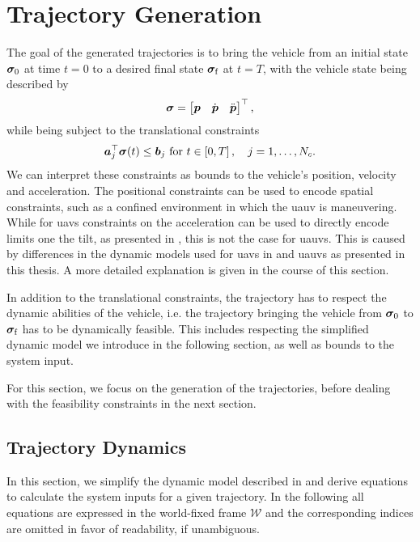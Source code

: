 \section{Trajectory Generation}
\label{sec:trajectory-generation}
The goal of the generated trajectories is to bring the vehicle from an initial state $\bm{\sigma}_0$ at time $t=0$ to a desired final state $\bm{\sigma}_{\text{f}}$ at $t=T$, with the vehicle state being described by 
\begin{equation}
	\bm{\sigma} = 
	\begin{bmatrix}
		\mbox{$\bm{p}$} & \mbox{$\dot{\bm{p}}$} & \mbox{$\ddot{\bm{p}}$}
	\end{bmatrix}^\top
	,
\end{equation}
while being subject to the translational constraints
\begin{equation}
	\label{eq:translational-constraints}
	\mbox{$\bm{a}$}_j^\top \bm{\sigma}(t) \leq \mbox{$\bm{b}$}_j
	\text{ for }
	t \in \left[0,T\right],
	\quad
	j=1,\dots,N_c
	.
\end{equation}
We can interpret these constraints as bounds to the vehicle's position, velocity and acceleration. The positional constraints can be used to encode spatial constraints, such as a confined environment in which the \ac{uauv} is maneuvering. While for \acp{uav} constraints on the acceleration can be used to directly encode limits one the tilt, as presented in \cite{MuellerHehn15}, this is not the case for \acp{uauv}. This is caused by differences in the dynamic models used for \acp{uav} in \cite{MuellerHehn15} and \acp{uauv} as presented in this thesis. A more detailed explanation is given in the course of this section.

In addition to the translational constraints, the trajectory has to respect the dynamic abilities of the vehicle, i.e. the trajectory bringing the vehicle from $\bm{\sigma}_0$ to $\bm{\sigma}_\text{f}$ has to be dynamically feasible. This includes respecting the simplified dynamic model we introduce in the following section, as well as bounds to the system input.

For this section, we focus on the generation of the trajectories, before dealing with the feasibility constraints in the next section.

\subsection{Trajectory Dynamics}
\label{sec:trajectory-dynamics}
In this section, we simplify the dynamic model described in  and derive equations to calculate the system inputs for a given trajectory. In the following all equations are expressed in the world-fixed frame $\mathcal{W}$ and the corresponding indices are omitted in favor of readability, if unambiguous.

